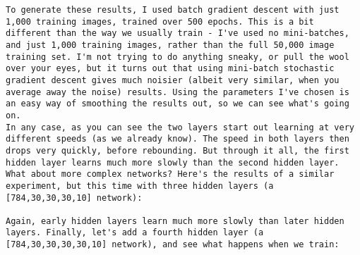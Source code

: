 \begin{lstlisting}
To generate these results, I used batch gradient descent with just 1,000 training images, trained over 500 epochs. This is a bit different than the way we usually train - I've used no mini-batches, and just 1,000 training images, rather than the full 50,000 image training set. I'm not trying to do anything sneaky, or pull the wool over your eyes, but it turns out that using mini-batch stochastic gradient descent gives much noisier (albeit very similar, when you average away the noise) results. Using the parameters I've chosen is an easy way of smoothing the results out, so we can see what's going on.
In any case, as you can see the two layers start out learning at very different speeds (as we already know). The speed in both layers then drops very quickly, before rebounding. But through it all, the first hidden layer learns much more slowly than the second hidden layer.
What about more complex networks? Here's the results of a similar experiment, but this time with three hidden layers (a [784,30,30,30,10] network):

Again, early hidden layers learn much more slowly than later hidden layers. Finally, let's add a fourth hidden layer (a [784,30,30,30,30,10] network), and see what happens when we train:


\end{lstlisting}
